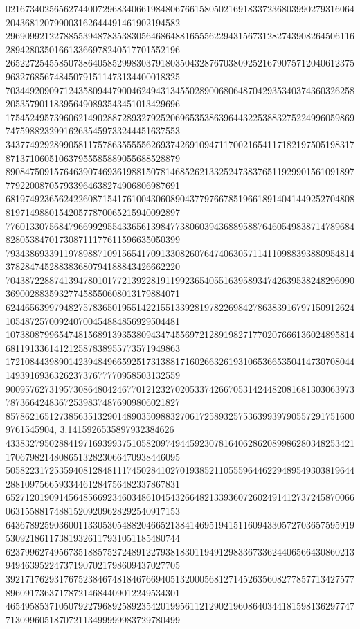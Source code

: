 \begin{DoxyCode}
      021673402565627440072968340661984806766158050216918337236803990279316064204368120799003162644491461902194582
      296909921227885539487835383056468648816555622943156731282743908264506116289428035016613366978240517701552196
      265227254558507386405852998303791803504328767038092521679075712040612375963276856748450791511473134400018325
      703449209097124358094479004624943134550289006806487042935340374360326258205357901183956490893543451013429696
      175452495739606214902887289327925206965353863964432253883275224996059869747598823299162635459733244451637553
      343774929289905811757863555556269374269109471170021654117182197505198317871371060510637955585889055688528879
      890847509157646390746936198815078146852621332524738376511929901561091897779220087057933964638274906806987691
      681974923656242260871541761004306089043779766785196618914041449252704808819714988015420577870065215940092897
      776013307568479669929554336561398477380603943688958876460549838714789684828053847017308711177611596635050399
      793438693391197898871091565417091330826076474063057114110988393880954814378284745288383680794188843426662220
      704387228874139478010177213922819119923654055163958934742639538248296090369002883593277458550608013179884071
      624465639979482757836501955142215513392819782269842786383916797150912624105487257009240700454884856929504481
      107380879965474815689139353809434745569721289198271770207666136024895814681191336141212587838955773571949863
      172108443989014239484966592517313881716026632619310653665350414730708044149391693632623737677770958503132559
      900957627319573086480424677012123270205337426670531424482081681303063973787366424836725398374876909806021827
      8578621651273856351329014890350988327061725893257536399397905572917516009761545904, 3.1415926535897932384626
      433832795028841971693993751058209749445923078164062862089986280348253421170679821480865132823066470938446095
      505822317253594081284811174502841027019385211055596446229489549303819644288109756659334461284756482337867831
      652712019091456485669234603486104543266482133936072602491412737245870066063155881748815209209628292540917153
      643678925903600113305305488204665213841469519415116094330572703657595919530921861173819326117931051185480744
      623799627495673518857527248912279381830119491298336733624406566430860213949463952247371907021798609437027705
      392171762931767523846748184676694051320005681271452635608277857713427577896091736371787214684409012249534301
      465495853710507922796892589235420199561121290219608640344181598136297747713099605187072113499999983729780499

\end{DoxyCode}
